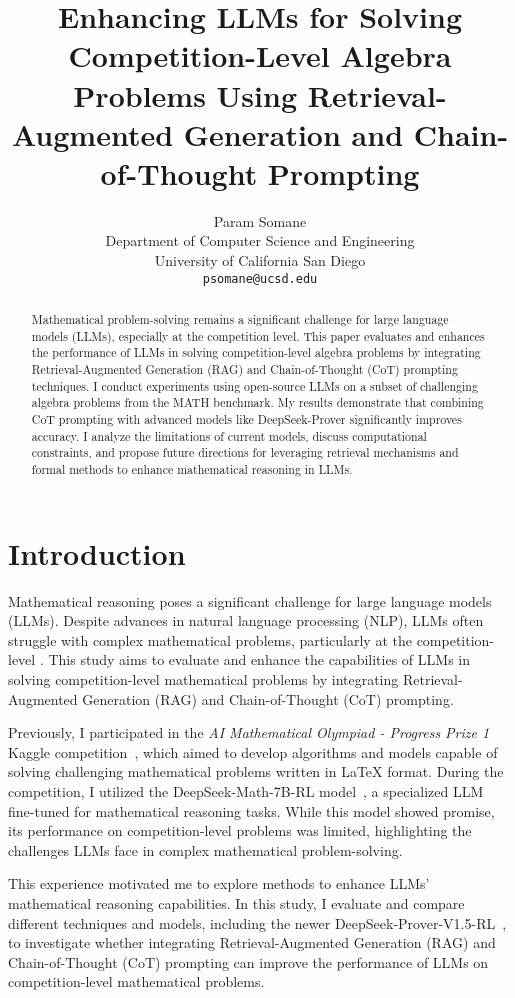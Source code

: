 \documentclass[11pt,a4paper]{article}
\title{Enhancing LLMs for Solving Competition-Level Algebra Problems Using Retrieval-Augmented Generation and Chain-of-Thought Prompting}
\author{Param Somane \\
  Department of Computer Science and Engineering \\
  University of California San Diego \\
  \texttt{psomane@ucsd.edu} \\}
\date{}
\begin{document}
\maketitle

\begin{abstract}
Mathematical problem-solving remains a significant challenge for large language models (LLMs), especially at the competition level. This paper evaluates and enhances the performance of LLMs in solving competition-level algebra problems by integrating Retrieval-Augmented Generation (RAG) and Chain-of-Thought (CoT) prompting techniques. I conduct experiments using open-source LLMs on a subset of challenging algebra problems from the MATH benchmark. My results demonstrate that combining CoT prompting with advanced models like DeepSeek-Prover significantly improves accuracy. I analyze the limitations of current models, discuss computational constraints, and propose future directions for leveraging retrieval mechanisms and formal methods to enhance mathematical reasoning in LLMs.
\end{abstract}

\section{Introduction}
Mathematical reasoning poses a significant challenge for large language models (LLMs). Despite advances in natural language processing (NLP), LLMs often struggle with complex mathematical problems, particularly at the competition-level \cite{hendrycks2021measuringmathematicalproblemsolving}. This study aims to evaluate and enhance the capabilities of LLMs in solving competition-level mathematical problems by integrating Retrieval-Augmented Generation (RAG) and Chain-of-Thought (CoT) prompting.

Previously, I participated in the \textit{AI Mathematical Olympiad - Progress Prize 1} Kaggle competition~\cite{aimo2024}, which aimed to develop algorithms and models capable of solving challenging mathematical problems written in \LaTeX{} format. During the competition, I utilized the DeepSeek-Math-7B-RL model~\cite{shao2024deepseekmathpushinglimitsmathematical}, a specialized LLM fine-tuned for mathematical reasoning tasks. While this model showed promise, its performance on competition-level problems was limited, highlighting the challenges LLMs face in complex mathematical problem-solving.

This experience motivated me to explore methods to enhance LLMs' mathematical reasoning capabilities. In this study, I evaluate and compare different techniques and models, including the newer DeepSeek-Prover-V1.5-RL~\cite{xin2024deepseekproverv15harnessingproofassistant}, to investigate whether integrating Retrieval-Augmented Generation (RAG) and Chain-of-Thought (CoT) prompting can improve the performance of LLMs on competition-level mathematical problems.
\end{document}
